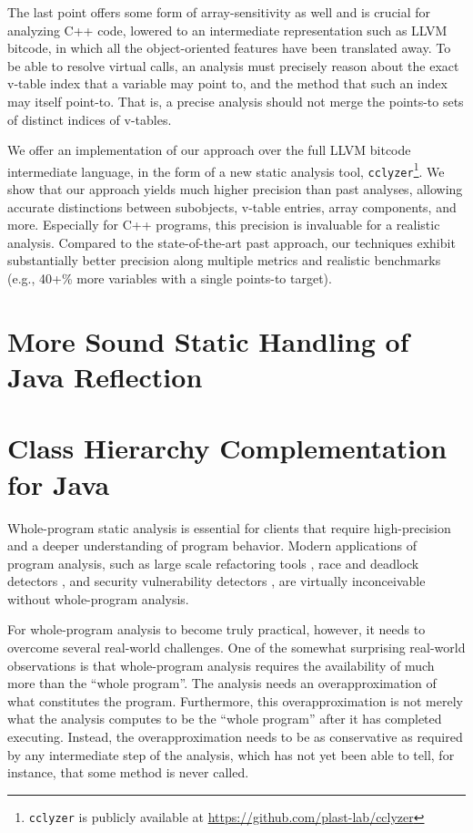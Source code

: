 \documentclass{llncs}
\newcommand{\cclyzer}{\texttt{cclyzer}}
\begin{document}
\noindent
The last point offers some form of array-sensitivity
as well and is crucial for analyzing C++ code, lowered to an
intermediate representation such as LLVM bitcode, in which all the
object-oriented features have been translated away. To be able to
resolve virtual calls, an analysis must precisely reason about the
exact v-table index that a variable may point to, and the method that
such an index may itself point-to. That is, a precise analysis should
not merge the points-to sets of distinct indices of v-tables.

We offer an implementation of our approach over the full LLVM bitcode
intermediate language, in the form of a new static analysis tool,
\cclyzer{}\footnote{\cclyzer{} is publicly available at
  \url{https://github.com/plast-lab/cclyzer}}.  We show that our
approach yields much higher precision than past analyses, allowing
accurate distinctions between subobjects, v-table entries, array
components, and more. Especially for C++ programs, this precision is
invaluable for a realistic analysis. Compared to the state-of-the-art
past approach, our techniques exhibit substantially better precision
along multiple metrics and realistic benchmarks (e.g., 40+\% more
variables with a single points-to target).

\section{More Sound Static Handling of Java Reflection}


\section{Class Hierarchy Complementation for Java}

Whole-program static analysis is essential for clients that require
high-precision
and a deeper understanding of program behavior. Modern applications of
program analysis, such as large scale refactoring tools
\cite{journals/software/Dig11}, race and deadlock detectors
\cite{pldi/NaikAW06}, and security vulnerability detectors
\cite{sigsoft/MadsenLF13,uss/GuarnieriL09}, are virtually
inconceivable without whole-program analysis.

For whole-program analysis to become truly practical, however, it
needs to overcome several real-world challenges. One of the somewhat
surprising real-world observations is that whole-program analysis
requires the availability of much more than the ``whole program''.
The analysis needs an overapproximation of what constitutes the
program. Furthermore, this overapproximation is not merely
what the analysis computes to be the ``whole program'' after it
has completed executing. Instead, the overapproximation needs to be
as conservative as required by any intermediate step of the analysis,
which has not yet been able to tell, for instance, that some method
is never called.
\end{document}
